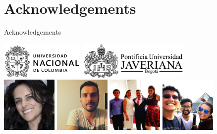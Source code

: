 \documentclass[11pt]{beamer}
\begin{document}
\section{Acknowledgements}
\begin{frame}{Acknowledgements}
\begin{center}
\includegraphics[height=1.8cm]{UN}\hspace{0.5cm}
\includegraphics[height=1.8cm]{Javeriana}\vspace{0.5cm}\\
\includegraphics[width=2.7cm]{Janneth}
\includegraphics[width=2.7cm]{Andres}
\includegraphics[width=2.7cm]{Familia}
\includegraphics[width=2.7cm]{Kelly-Juan-Daniel}\\
\end{center}
\end{frame}
\end{document}
